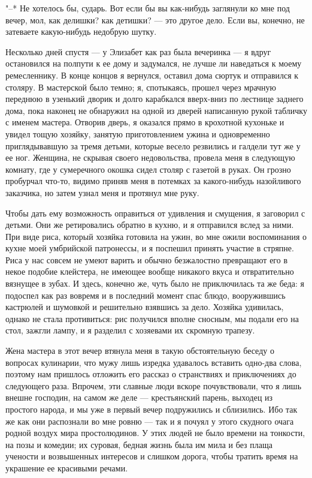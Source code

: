 "--* Не  хотелось бы, сударь. Вот  если бы вы как-нибудь  заглянули ко
мне под  вечер, мол, как  делишки? как  детишки? --- это  другое дело.
Если вы, конечно, не затеваете какую-нибудь недобрую шутку.

Несколько дней  спустя ---  у Элизабет  как раз  была вечеринка  --- я
вдруг  остановился на  полпути  к ее  дому и  задумался,  не лучше  ли
наведаться к  моему ремесленнику. В  конце концов я  вернулся, оставил
дома  сюртук и  отправился  к  столяру. В  мастерской  было темно;  я,
спотыкаясь, прошел  через мрачную переднюю  в узенький дворик  и долго
карабкался  вверх-вниз  по  лестнице  заднего дома,  пока  наконец  не
обнаружил  на  одной из  дверей  написанную  рукой табличку  с  именем
мастера.  Отворив  дверь, я  оказался  прямо  в крохотной  кухоньке  и
увидел  тощую хозяйку,  занятую  приготовлением  ужина и  одновременно
приглядывавшую за тремя детьми, которые весело резвились и галдели тут
же у ее  ног. Женщина, не скрывая своего недовольства,  провела меня в
следующую комнату, где  у сумеречного окошка сидел столяр  с газетой в
руках. Он  грозно пробурчал что-то,  видимо приняв меня в  потемках за
какого-нибудь назойливого  заказчика, но  затем узнал меня  и протянул
мне руку.

Чтобы  дать ему  возможность  оправиться от  удивления  и смущения,  я
заговорил  с  детьми.  Они  же  ретировались  обратно  в  кухню,  и  я
отправился вслед за  ними. При виде риса, который  хозяйка готовила на
ужин, во мне ожили воспоминания  о кухне моей умбрийской патронессы, и
я  поспешил принять  участие в  стряпне. Риса  у нас  совсем не  умеют
варить и обычно безжалостно превращают  его в некое подобие клейстера,
не имеющее вообще  никакого вкуса и отвратительно вязнущее  в зубах. И
здесь, конечно  же, чуть было не  приключилась та же беда:  я подоспел
как  раз  вовремя  и  в  последний  момент  спас  блюдо,  вооружившись
кастрюлей и шумовкой и решительно взявшись за дело. Хозяйка удивилась,
однако не стала  противиться: рис получился вполне  сносным, мы подали
его  на стол,  зажгли  лампу, и  я разделил  с  хозяевами их  скромную
трапезу.

Жена мастера в этот вечер втянула  меня в такую обстоятельную беседу о
вопросах кулинарии, что мужу  лишь изредка удавалось вставить одно-два
слова,  поэтому нам  пришлось  отложить его  рассказ  о странствиях  и
приключениях  до следующего  раза.  Впрочем, эти  славные люди  вскоре
почувствовали,  что я  лишь  внешне  господин, на  самом  же деле  ---
крестьянский парень,  выходец из  простого народа, и  мы уже  в первый
вечер подружились и  сблизились. Ибо так же как они  распознали во мне
ровню ---  так и я  почуял у этого  скудного очага родной  воздух мира
простолюдинов. У  этих людей не  было времени  на тонкости, на  позы и
комедии; их суровая, бедная жизнь была  им мила и без плаща учености и
возвышенных  интересов  и  слишком  дорога,  чтобы  тратить  время  на
украшение ее красивыми речами.

